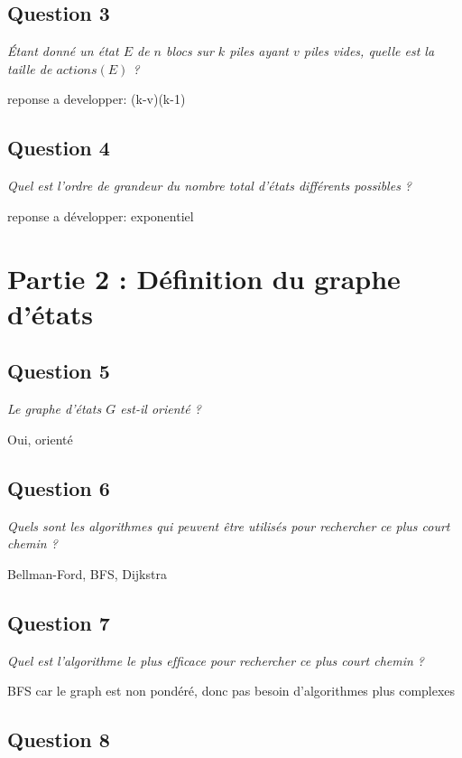 \subsection{Question 3}

\textit{Étant donné un état $E$ de $n$ blocs sur $k$ piles ayant $v$ piles vides, quelle est la taille de $actions(E)$ ?}

reponse a developper: (k-v)(k-1)

\subsection{Question 4}

\textit{Quel est l'ordre de grandeur du nombre total d'états différents possibles ?}

reponse a développer: exponentiel

\section{Partie 2 : Définition du graphe d'états}

\subsection{Question 5}

\textit{Le graphe d'états $G$ est-il orienté ?}

Oui, orienté

\subsection{Question 6}

\textit{Quels sont les algorithmes qui peuvent être utilisés pour rechercher ce plus court chemin ?}

Bellman-Ford, BFS, Dijkstra

\subsection{Question 7}

\textit{Quel est l'algorithme le plus efﬁcace pour rechercher ce plus court chemin ?}

BFS car le graph est non pondéré, donc pas besoin d'algorithmes plus complexes

\subsection{Question 8}

